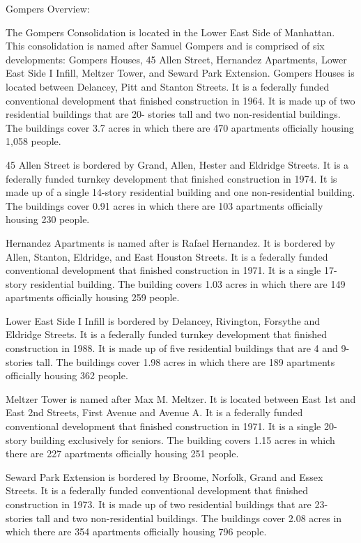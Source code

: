 Gompers Overview:     

   

The Gompers Consolidation is located in the Lower East Side of Manhattan. This consolidation is named after Samuel Gompers and is comprised of six developments: Gompers Houses, 45 Allen Street, Hernandez Apartments, Lower East Side I Infill, Meltzer Tower, and Seward Park Extension. Gompers Houses is located between Delancey, Pitt and Stanton Streets. It is a federally funded conventional development that finished construction in 1964. It is made up of two residential buildings that are 20- stories tall and two non-residential buildings. The buildings cover 3.7 acres in which there are 470 apartments officially housing 1,058 people. 

45 Allen Street is bordered by Grand, Allen, Hester and Eldridge Streets. It is a federally funded turnkey development that finished construction in 1974. It is made up of a single 14-story residential building and one non-residential building. The buildings cover 0.91 acres in which there are 103 apartments officially housing 230 people. 

Hernandez Apartments is named after is Rafael Hernandez. It is bordered by Allen, Stanton, Eldridge, and East Houston Streets. It is a federally funded conventional development that finished construction in 1971. It is a single 17- story residential building. The building covers 1.03 acres in which there are 149 apartments officially housing 259 people. 

Lower East Side I Infill is bordered by Delancey, Rivington, Forsythe and Eldridge Streets. It is a federally funded turnkey development that finished construction in 1988. It is made up of five residential buildings that are 4 and 9- stories tall. The buildings cover 1.98 acres in which there are 189 apartments officially housing 362 people. 

Meltzer Tower is named after Max M. Meltzer. It is located between East 1st and East 2nd Streets, First Avenue and Avenue A. It is a federally funded conventional development that finished construction in 1971. It is a single 20-story building exclusively for seniors. The building covers 1.15 acres in which there are 227 apartments officially housing 251 people. 

Seward Park Extension is bordered by Broome, Norfolk, Grand and Essex Streets. It is a federally funded conventional development that finished construction in 1973. It is made up of two residential buildings that are 23- stories tall and two non-residential buildings. The buildings cover 2.08 acres in which there are 354 apartments officially housing 796 people. 